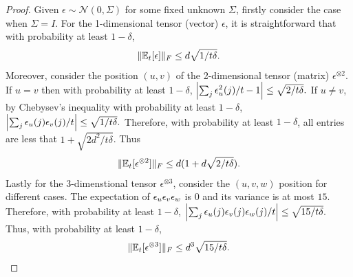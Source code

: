 \begin{proof}
	Given $\epsilon \sim \mathcal{N}(0,\Sigma)$ for some fixed unknown $\Sigma$, firstly consider the case when $\Sigma = I$.
	For the 1-dimensional tensor (vector) $\epsilon$, it is straightforward that with probability at least $1-\delta$,
	\begin{equation}
	\label{eq:A1claim2a}
	\| \mathbb{E}_t[\epsilon] \|_F \le d\sqrt{1/t\delta}.
	\end{equation}
	Moreover, consider the position $(u,v)$ of the 2-dimensional tensor (matrix) $\epsilon^{\otimes 2}$. If $u=v$ then with probability at least $1-\delta$,
	$
	\left| \sum_j \epsilon_u^2(j)/t - 1\right| \le \sqrt{2/t\delta}.
	$
	If $u\neq v$, by Chebysev's inequality with probability at least $1-\delta$,
	$
	\left| \sum_j \epsilon_u(j)\epsilon_v(j)/t \right| \le  \sqrt{1/t\delta}.
	$
	Therefore, with probability at least $1-\delta$, all entries are less that $1+\sqrt{2d^2/t\delta}$. Thus 
	\begin{equation}
	\label{eq:A1claim2b}
	\|\mathbb{E}_t[\epsilon^{\otimes 2}]\|_F \le d(1+d\sqrt{2/t\delta}).
	\end{equation}
	Lastly for the 3-dimenstional tensor $\epsilon^{\otimes 3}$, consider the $(u,v,w)$ position for different cases. The expectation of $\epsilon_u\epsilon_v\epsilon_w$ is 0 and its variance is at most  $15$. Therefore, with probability at least $1-\delta$,
	$
	\left|\sum_j \epsilon_u(j)\epsilon_v(j)\epsilon_w(j)/t \right| \le \sqrt{15/t\delta}.
	$
	Thus, with probability at least $1-\delta$,
	\begin{equation}
	\label{eq:A1claim2c}
	\|\mathbb{E}_t[\epsilon^{\otimes 3}]\|_F \le d^3\sqrt{15/t\delta}.
	\end{equation}
	

\end{proof}
